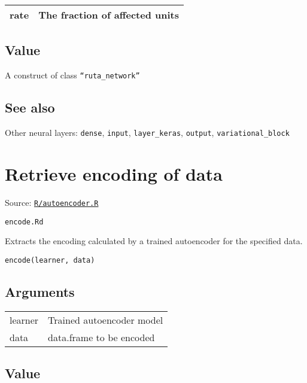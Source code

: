 \begin{longtable}[c]{@{}>{\small}p{3cm}>{\raggedright}p{12.5cm}@{}}
\toprule
rate & The fraction of affected units\tabularnewline
\bottomrule
\end{longtable}

\hypertarget{value}{\subsection{\texorpdfstring{\protect\hyperlink{value}{}Value}{Value}}\label{value}}

A construct of class \texttt{``ruta\_network''}

\hypertarget{see-also}{\subsection{\texorpdfstring{\protect\hyperlink{see-also}{}See
also}{See also}}\label{see-also}}

Other neural layers: \texttt{dense}, \texttt{input},
\texttt{layer\_keras}, \texttt{output}, \texttt{variational\_block}

\section{Retrieve encoding of data}\label{retrieve-encoding-of-data}

Source:
\href{https://github.com/fdavidcl/ruta/blob/master/R/autoencoder.R}{\texttt{R/autoencoder.R}}

\texttt{encode.Rd}

Extracts the encoding calculated by a trained autoencoder for the
specified data.

\begin{verbatim}
encode(learner, data)
\end{verbatim}

\hypertarget{arguments}{\subsection{\texorpdfstring{\protect\hyperlink{arguments}{}Arguments}{Arguments}}\label{arguments}}

\begin{longtable}[c]{@{}>{\small}p{3cm}>{\raggedright}p{12.5cm}@{}}
\toprule
learner & Trained autoencoder model\tabularnewline
data & data.frame to be encoded\tabularnewline
\bottomrule
\end{longtable}

\hypertarget{value}{\subsection{\texorpdfstring{\protect\hyperlink{value}{}Value}{Value}}\label{value}}

